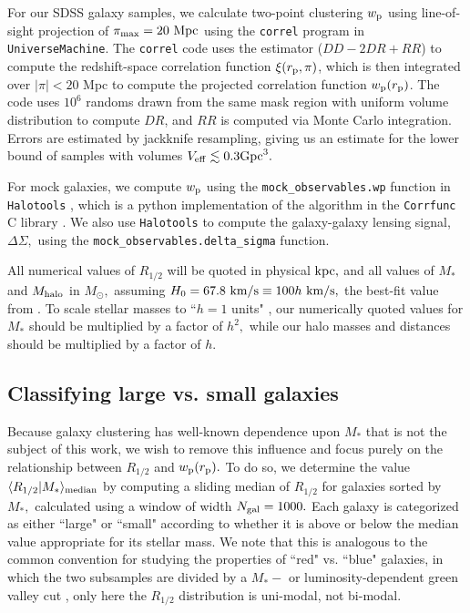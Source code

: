 \documentclass[usenatbib,usegraphicx,letterpaper]{mn2e}
\newcommand{\rhalf}{R_{1/2}}
\newcommand{\mstar}{M_{\ast}}
\newcommand{\mhalo}{M_{\rm halo}}
\newcommand{\rproj}{r_{\rm p}}
\newcommand{\wproj}{w_{\rm p}}
\newcommand{\median}[2]{\langle{#1}\vert{#2}\rangle_{\rm median}}
\newcommand{\kpc}{{\rm kpc}}
\newcommand{\mpc}{{\rm Mpc}}
\newcommand{\msun}{M_\odot}
\newcommand{\kms}{{\rm km/s}}
\begin{document}
For our SDSS galaxy samples, we calculate two-point clustering $\wproj$ using line-of-sight projection of $\pi_{\rm max}=20~\mpc$ using the {\tt correl} program in {\tt UniverseMachine}. The {\tt correl} code uses the \citet{landy_szalay93} estimator ($DD - 2DR + RR$) to compute the redshift-space correlation function $\xi(\rproj, \pi)$, which is then integrated over $\vert\pi\vert < 20$ Mpc to compute the projected correlation function $\wproj(\rproj)$.  The code uses $10^6$ randoms drawn from the same mask region with uniform volume distribution to compute $DR$, and $RR$ is computed via Monte Carlo integration. Errors are estimated by jackknife resampling, giving us an estimate for the lower bound of samples with volumes $V_{\rm eff}\lesssim 0.3{\rm Gpc}^3.$

For mock galaxies, we compute $\wproj$ using the {\tt mock\_observables.wp} function in {\tt Halotools} \citep{hearin_etal16}, which is a python implementation of the algorithm in the {\tt Corrfunc} C library \citep{sinha_etal17}. We also use {\tt Halotools} to compute the galaxy-galaxy lensing signal, $\Delta\Sigma,$ using the {\tt mock\_observables.delta\_sigma} function.

All numerical values of $\rhalf$ will be quoted in physical $\kpc,$ and all values of $\mstar$ and $\mhalo$ in $\msun,$ assuming $H_0=67.8~\kms\equiv100h~\kms,$ the best-fit value from \citet{planck15}. To scale stellar masses to ``$h=1$ units" \citep{croton13}, our numerically quoted values for $\mstar$ should be multiplied by a factor of $h^2,$ while our halo masses and distances should be multiplied by a factor of $h.$

\subsection{Classifying large vs. small galaxies}
\label{subsec:sizedef}

Because galaxy clustering has well-known dependence upon $\mstar$ that is not the subject of this work, we wish to remove this influence and focus purely on the relationship between $\rhalf$ and $\wproj(\rproj).$ To do so, we determine the value $\median{\rhalf}{\mstar}$ by computing a sliding median of $\rhalf$ for galaxies sorted by $\mstar,$ calculated using a window of width $N_{\rm gal}=1000.$ Each galaxy is categorized as either ``large" or ``small" according to whether it is above or below the median value appropriate for its stellar mass. We note that this is analogous to the common convention for studying the properties of ``red" vs. ``blue" galaxies, in which the two subsamples are divided by a $\mstar-$ or luminosity-dependent green valley cut \citep[e.g.,][]{vdB_etal08,zehavi_etal11}, only here the $\rhalf$ distribution is uni-modal, not bi-modal.
\end{document}
